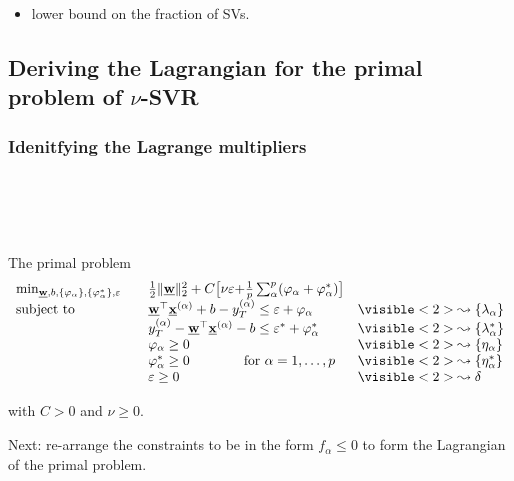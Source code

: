 \begin{frame}
\begin{itemize}
     \item lower bound on the fraction of SVs.
     \end{itemize}
\end{frame}


\subsection{Deriving the Lagrangian for the primal problem of $\nu$-SVR}

\subsubsection{Idenitfying the Lagrange multipliers}

\begin{frame}\frametitle{\subsecname\\ \subsubsecname}

\slidesonly{\vspace{-3mm}}

\\

\slidesonly{\vspace{-3mm}}

\begin{block}{The primal problem}
     \begin{equation}
        \begin{array}{lrll}
        \min_{\vec w, b,\{\varphi_\alpha\}, \{\varphi_\alpha^*\}{, {{\varepsilon}}}} && \frac{1}{2} \lVert \vec w \rVert_{2}^{2} + C {\big\lbrack \nu{\varepsilon} + } \frac{1}{p} \sum_{\alpha}^p (\varphi_\alpha + \varphi_\alpha^*) {\big\rbrack}			&\\
        \text{subject to}
        &&\vec w^{\top} \vec x^{(\alpha)} + b - y_{T}^{(\alpha)} \le \varepsilon + \varphi_\alpha		&\visible<2>{\leadsto\{\lambda_{\alpha}\}}\\
        &&y_{T}^{(\alpha)} - \vec w^{\top} \vec x^{(\alpha)} - b \le \varepsilon^* + \varphi_\alpha^*	&\visible<2>{\leadsto\{\lambda_{\alpha}^*\}}\\
        &&\varphi_\alpha \ge 0  												&\visible<2>{\leadsto\{\eta_{\alpha}\}}\\
        &&\varphi_\alpha^* \ge 0 \qquad\qquad \text{for }\alpha=1,\ldots,p 		&\visible<2>{\leadsto\{\eta_{\alpha}^*\}}\\
        &&\varepsilon \ge 0														&\visible<2>{\leadsto\delta}
        \end{array}
     \end{equation}
        
        with $C>0$ and $\nu \ge 0$.
\end{block}

\pause

Next: re-arrange the constraints to be in the form $f_\alpha \le 0$ to form the Lagrangian of the primal problem.

\end{frame}

